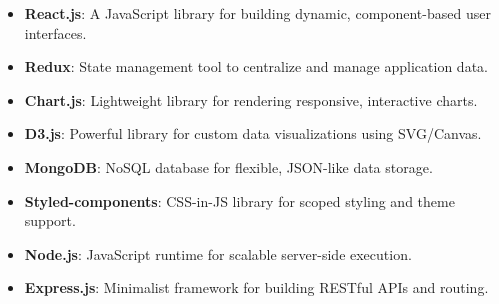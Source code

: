 

\begin{itemize}
    \item \textbf{\textcolor{techblue}{React.js}}: A JavaScript library for building dynamic, component-based user interfaces.
    
    \item \textbf{\textcolor{techblue}{Redux}}: State management tool to centralize and manage application data.
    
    \item \textbf{\textcolor{techblue}{Chart.js}}: Lightweight library for rendering responsive, interactive charts.
    
    \item \textbf{\textcolor{techblue}{D3.js}}: Powerful library for custom data visualizations using SVG/Canvas.
    
    \item \textbf{\textcolor{techblue}{MongoDB}}: NoSQL database for flexible, JSON-like data storage.
    
    \item \textbf{\textcolor{techblue}{Styled-components}}: CSS-in-JS library for scoped styling and theme support.
    
    \item \textbf{\textcolor{techblue}{Node.js}}: JavaScript runtime for scalable server-side execution.
    
    \item \textbf{\textcolor{techblue}{Express.js}}: Minimalist framework for building RESTful APIs and routing.
\end{itemize}
